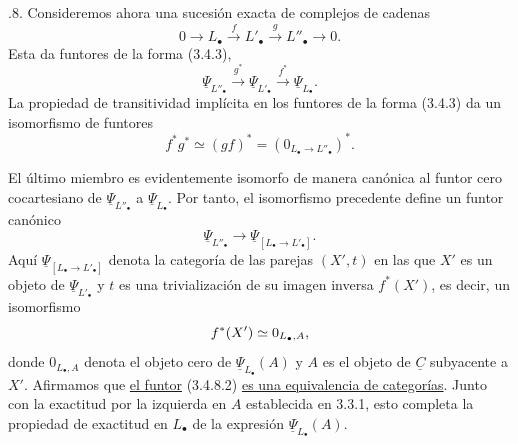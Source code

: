 \par\medskip{}.8. Consideremos ahora una sucesión exacta de complejos de cadenas
\begin{equation}\tag{3.4.8.1}
 0\longrightarrow L_\bullet\xrightarrow{f}L'_\bullet
 \xrightarrow{g}L''_\bullet\longrightarrow0.
\end{equation}
Esta da funtores de la forma (3.4.3),
\[
 \underline\Psi_{L''_\bullet}\xrightarrow{g^*}
 \underline\Psi_{L'_\bullet}\xrightarrow{f^*}
 \underline\Psi_{L_\bullet}.
\]
La propiedad de transitividad implícita en los funtores de la forma
(3.4.3) da un isomorfismo de funtores
\[
 f^*g^*\simeq(gf)^*=(0_{L_\bullet\to L''_\bullet})^*.
\]


El último miembro es evidentemente isomorfo de manera canónica al funtor
cero cocartesiano de $\underline\Psi_{L''_\bullet}$ a
$\underline\Psi_{L_\bullet}$. Por tanto, el isomorfismo precedente
define un funtor canónico
\begin{equation}\tag{3.4.8.2}
 \underline\Psi_{L''_\bullet}\longrightarrow
 \underline\Psi_{[L_\bullet\longrightarrow L'_\bullet]}.
\end{equation}
Aquí $\underline\Psi_{[L_\bullet\longrightarrow L'_\bullet]}$ denota
la categoría de las parejas $(X',t)$ en las que $X'$ es un objeto de
$\underline\Psi_{L'_\bullet}$ y $t$ es una trivialización de su imagen
inversa $f^*(X')$, es decir, un isomorfismo
\[
 f^*(X')\simeq\sisi{0_{L_\bullet,A'}}{0_{L_\bullet,A}},
\]
donde $0_{L_\bullet,A}$ denota el objeto cero de
$\underline\Psi_{L_\bullet}(A)$ y $A$ es el objeto de
$\underline C$ subyacente a $X'$. Afirmamos que \underline{el
funtor} (3.4.8.2) \underline{es una equivalencia de categorías}.
Junto con la exactitud por la izquierda en $A$ establecida en 3.3.1,
esto completa la propiedad de exactitud en $L_\bullet$ de la expresión
$\underline\Psi_{L_\bullet}(A)$.

